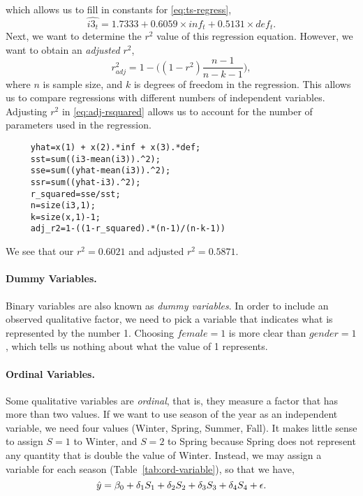 which allows us to fill in constants for \eqref{eq:ts-regress},
\[
\widehat{i3_t} = 1.7333 + 0.6059 \times inf_t + 0.5131 \times def_t.
\]
Next, we want to determine the $r^2$ value of this regression equation. However, we want to obtain an \emph{adjusted} $r^2$,
\begin{equation}
r^2_{adj} = 1- \Big( (1-r^2)\frac{n-1}{n-k-1} \Big),
\label{eq:adj-rsquared}
\end{equation}
where $n$ is sample size, and $k$ is degrees of freedom in the regression. This allows us to compare regressions with different numbers of independent variables. Adjusting $r^2$ in \eqref{eq:adj-rsquared} allows us to account for the number of parameters used in the regression.
\pagebreak[3]
\begin{verbatim}
     yhat=x(1) + x(2).*inf + x(3).*def;
     sst=sum((i3-mean(i3)).^2);
     sse=sum((yhat-mean(i3)).^2);
     ssr=sum((yhat-i3).^2);
     r_squared=sse/sst;
     n=size(i3,1);
     k=size(x,1)-1;
     adj_r2=1-((1-r_squared).*(n-1)/(n-k-1))
\end{verbatim}
\pagebreak[3]
We see that our $r^2=0.6021$ and adjusted $r^2=0.5871$.

\paragraph{Dummy Variables.}\label{dummy-variable}
Binary variables are also known as \emph{dummy variables}. In order to include an observed qualitative factor, we need to pick a variable that indicates what is represented by the number 1. Choosing $female=1$ is more clear than $gender=1$, which tells us nothing about what the value of 1 represents. %
\paragraph{Ordinal Variables.}Some qualitative variables are \emph{ordinal}, that is, they measure a factor that has more than two values. If we want to use season of the year as an independent variable, we need four values (Winter, Spring, Summer, Fall). It makes little sense to assign $S=1$ to Winter, and $S=2$ to Spring because Spring does not represent any quantity that is double the value of Winter.  Instead, we may assign a variable for each season (Table~\ref{tab:ord-variable}), so that we have,
\[
\hat{y} = \beta_0 + \delta_1 S_1 + \delta_2 S_2 + \delta_3 S_3 +\delta_4 S_4 + \epsilon.
\index{beta@$\beta$ (beta)!in regression}
\]

